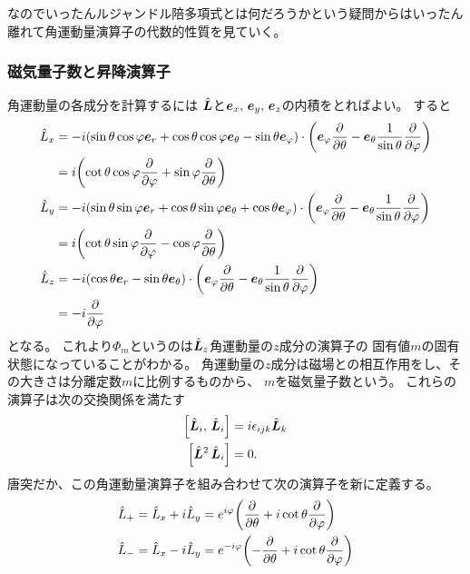 \documentclass[../../master.tex]{subfiles}
\begin{document}
なのでいったんルジャンドル陪多項式とは何だろうかという疑問からはいったん離れて角運動量演算子の代数的性質を見ていく。

\subsubsection*{磁気量子数と昇降演算子}

角運動量の各成分を計算するには
\(\hat{\vb*{L}}\)と\(\vb*{e}_x,\,\vb*{e}_y,\,\vb*{e}_z\)の内積をとればよい。
すると
\begin{align}
	\hat{L}_x
	 & = -i(\sin\theta\cos\varphi \vb*{e}_r + \cos\theta\cos\varphi \vb*{e}_\theta - \sin\theta \vb*{e}_\varphi) \cdot
	\qty(\vb*{e}_{\varphi}\pdv{\theta}-\vb*{e}_{\theta}\frac{1}{\sin\theta}\pdv{\varphi}) \notag                       \\
	 & = i\qty(\cot\theta\cos\varphi\pdv{\varphi}+\sin\varphi\pdv{\theta})                                             \\
	\hat{L}_y
	 & = -i(\sin\theta\sin\varphi \vb*{e}_r + \cos\theta\sin\varphi \vb*{e}_\theta + \cos\theta \vb*{e}_\varphi) \cdot
	\qty(\vb*{e}_{\varphi}\pdv{\theta}-\vb*{e}_{\theta}\frac{1}{\sin\theta}\pdv{\varphi}) \notag                       \\
	 & = i\qty(\cot\theta\sin\varphi\pdv{\varphi}-\cos\varphi\pdv{\theta})                                             \\
	\hat{L}_z
	 & = -i(\cos\theta\vb*{e}_r -\sin\theta\vb*{e}_\theta) \cdot
	\qty(\vb*{e}_{\varphi}\pdv{\theta}-\vb*{e}_{\theta}\frac{1}{\sin\theta}\pdv{\varphi}) \notag                       \\
	 & = -i\pdv{\varphi}
\end{align}
となる。
これより\(\Phi_m\)というのは\(\hat{\vb*{L}}_z\)角運動量の\(z\)成分の演算子の
固有値\(m\)の固有状態になっていることがわかる。
角運動量の\(z\)成分は磁場との相互作用をし、その大きさは分離定数\(m\)に比例するものから、
\(m\)を磁気量子数という。
これらの演算子は次の交換関係を満たす
\begin{align}
	\qty[\hat{\vb*{L}}_i,\,\hat{\vb*{L}}_i] &= i\epsilon_{ijk}\hat{\vb*{L}}_k\\
	\qty[\hat{\vb*{L}}^2\,\hat{\vb*{L}}_i]&=0.
\end{align}
唐突だか、この角運動量演算子を組み合わせて次の演算子を新に定義する。
\begin{align}
	\hat{L}_+ &= \hat{L}_x + i\hat{L}_y = e^{ i\varphi}\qty( \pdv{\theta} +i\cot\theta\pdv{\varphi})\\
	\hat{L}_- &= \hat{L}_x - i\hat{L}_y	= e^{-i\varphi}\qty(-\pdv{\theta} +i\cot\theta\pdv{\varphi})
\end{align}
\end{document}
